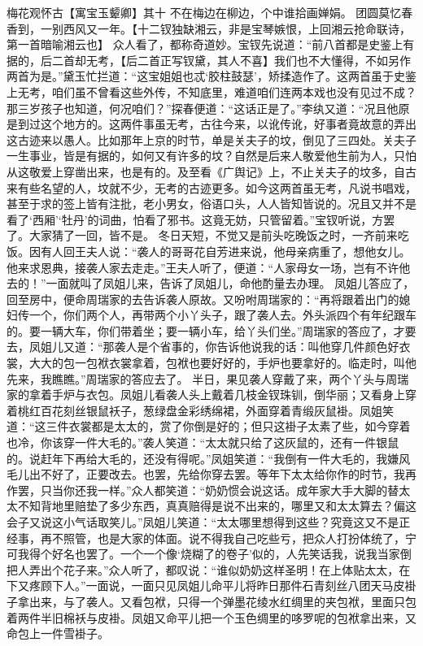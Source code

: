 \documentclass[12pt,oneside]{book}
\begin{document}
梅花观怀古【寓宝玉颦卿】其十
不在梅边在柳边，个中谁拾画婵娟。
团圆莫忆春香到，一别西风又一年。【十二钗独缺湘云，非是宝琴嫉恨，上回湘云抢命联诗，第一首暗喻湘云也】
    众人看了，都称奇道妙。宝钗先说道：“前八首都是史鉴上有据的，后二首却无考，【后二首正写钗黛，其人不喜】我们也不大懂得，不如另作两首为是。”黛玉忙拦道：“这宝姐姐也忒‘胶柱鼓瑟’，矫揉造作了。这两首虽于史鉴上无考，咱们虽不曾看这些外传，不知底里，难道咱们连两本戏也没有见过不成？那三岁孩子也知道，何况咱们？”探春便道：“这话正是了。”李纨又道：“况且他原是到过这个地方的。这两件事虽无考，古往今来，以讹传讹，好事者竟故意的弄出这古迹来以愚人。比如那年上京的时节，单是关夫子的坟，倒见了三四处。关夫子一生事业，皆是有据的，如何又有许多的坟？自然是后来人敬爱他生前为人，只怕从这敬爱上穿凿出来，也是有的。及至看《广舆记》上，不止关夫子的坟多，自古来有些名望的人，坟就不少，无考的古迹更多。如今这两首虽无考，凡说书唱戏，甚至于求的签上皆有注批，老小男女，俗语口头，人人皆知皆说的。况且又并不是看了‘西厢’‘牡丹’的词曲，怕看了邪书。这竟无妨，只管留着。”宝钗听说，方罢了。大家猜了一回，皆不是。
冬日天短，不觉又是前头吃晚饭之时，一齐前来吃饭。因有人回王夫人说：“袭人的哥哥花自芳进来说，他母亲病重了，想他女儿。他来求恩典，接袭人家去走走。”王夫人听了，便道：“人家母女一场，岂有不许他去的！”一面就叫了凤姐儿来，告诉了凤姐儿，命他酌量去办理。
凤姐儿答应了，回至房中，便命周瑞家的去告诉袭人原故。又吩咐周瑞家的：“再将跟着出门的媳妇传一个，你们两个人，再带两个小丫头子，跟了袭人去。外头派四个有年纪跟车的。要一辆大车，你们带着坐；要一辆小车，给丫头们坐。”周瑞家的答应了，才要去，凤姐儿又道：“那袭人是个省事的，你告诉他说我的话：叫他穿几件颜色好衣裳，大大的包一包袱衣裳拿着，包袱也要好好的，手炉也要拿好的。临走时，叫他先来，我瞧瞧。”周瑞家的答应去了。
半日，果见袭人穿戴了来，两个丫头与周瑞家的拿着手炉与衣包。凤姐儿看袭人头上戴着几枝金钗珠钏，倒华丽；又看身上穿着桃红百花刻丝银鼠袄子，葱绿盘金彩绣绵裙，外面穿着青缎灰鼠褂。凤姐笑道：“这三件衣裳都是太太的，赏了你倒是好的；但只这褂子太素了些，如今穿着也冷，你该穿一件大毛的。”袭人笑道：“太太就只给了这灰鼠的，还有一件银鼠的。说赶年下再给大毛的，还没有得呢。”凤姐笑道：“我倒有一件大毛的，我嫌风毛儿出不好了，正要改去。也罢，先给你穿去罢。等年下太太给你作的时节，我再作罢，只当你还我一样。”众人都笑道：“奶奶惯会说这话。成年家大手大脚的替太太不知背地里赔垫了多少东西，真真赔得是说不出来的，哪里又和太太算去？偏这会子又说这小气话取笑儿。”凤姐儿笑道：“太太哪里想得到这些？究竟这又不是正经事，再不照管，也是大家的体面。说不得我自己吃些亏，把众人打扮体统了，宁可我得个好名也罢了。一个一个像‘烧糊了的卷子’似的，人先笑话我，说我当家倒把人弄出个花子来。”众人听了，都叹说：“谁似奶奶这样圣明！在上体贴太太，在下又疼顾下人。”一面说，一面只见凤姐儿命平儿将昨日那件石青刻丝八团天马皮褂子拿出来，与了袭人。又看包袱，只得一个弹墨花绫水红绸里的夹包袱，里面只包着两件半旧棉袄与皮褂。凤姐又命平儿把一个玉色绸里的哆罗呢的包袱拿出来，又命包上一件雪褂子。
\end{document}
